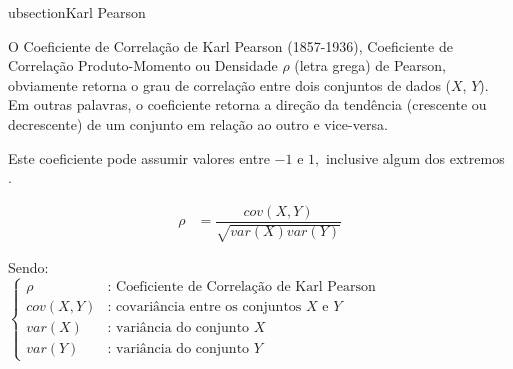 ubsection{Karl Pearson}
		
			O Coeficiente de Correlação de Karl Pearson (1857-1936), Coeficiente de Correlação Produto-Momento ou Densidade $ \rho $ (letra grega) de Pearson, obviamente retorna o grau de correlação entre dois conjuntos de dados ($X$, $Y$). Em outras palavras, o coeficiente retorna a direção da tendência (crescente ou decrescente) de um conjunto em relação ao outro e vice-versa.
			
			Este coeficiente pode assumir valores entre $-1$ e $1,$ inclusive algum dos extremos \cite{pearson1895}.
			
			\begin{align}
				\rho & = \dfrac{cov(X, Y)}{\sqrt{var(X)var(Y)}}
			\end{align}
			
			Sendo: \\
			
			$ \begin{cases}
					\rho & \text{: Coeficiente de Correlação de Karl Pearson} \\[0.3cm]
					cov(X, Y) & \text{: covariância entre os conjuntos $X$ e $Y$} \\[0.3cm]
					var(X) & \text{: variância do conjunto $X$} \\[0.3cm]
					var(Y) & \text{: variância do conjunto $Y$}
				\end{cases} $
		
